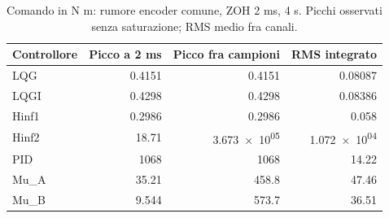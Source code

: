 \begin{table}[htbp]\centering\small
\setlength{\tabcolsep}{4pt}
\begin{tabular}{lrrr}\toprule
Controllore & Picco a 2 ms & Picco fra campioni & RMS integrato\\\midrule
LQG & \num{0.4151} & \num{0.4151} & \num{0.08087}\\
LQGI & \num{0.4298} & \num{0.4298} & \num{0.08386}\\
Hinf1 & \num{0.2986} & \num{0.2986} & \num{0.058}\\
Hinf2 & \num{18.71} & \num{3.673e+05} & \num{1.072e+04}\\
PID & \num{1068} & \num{1068} & \num{14.22}\\
Mu\_A & \num{35.21} & \num{458.8} & \num{47.46}\\
Mu\_B & \num{9.544} & \num{573.7} & \num{36.51}\\
\bottomrule\end{tabular}
\caption{Comando in N m: rumore encoder comune, ZOH 2 ms, 4 s. Picchi osservati senza saturazione; RMS medio fra canali.}
\end{table}
